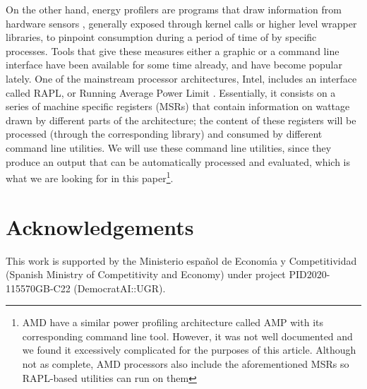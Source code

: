 \documentclass[a4paper,twoside]{article}
\begin{document}
On the other hand, energy profilers are programs that draw information from
hardware sensors \cite{sinha2001jouletrack}, generally exposed through kernel
calls or higher level wrapper libraries, to pinpoint consumption during a period
of time of by specific processes. Tools that give these measures either a
graphic  or a command line interface have been available for some time already,
and have become popular lately. One of the mainstream processor architectures,
Intel, includes an interface called RAPL, or Running Average Power
Limit \cite{rapl}. Essentially, it consists on a series of machine specific registers (MSRs)
that contain information on wattage drawn by different parts of the
architecture; the content of these registers will be processed (through the
corresponding library) and consumed by different command line utilities. We will
use these command line utilities, since they produce an output that can be
automatically processed and evaluated, which is what we are looking for in this
paper\footnote{AMD have a similar power profiling architecture called AMP with
  its corresponding command line tool. However, it was not well documented and
  we found it excessively complicated for the purposes of this article. Although
  not as complete, AMD processors also include the aforementioned MSRs so
  RAPL-based utilities can run on them}.

\section*{Acknowledgements}

This work is supported by the Ministerio espa\~{n}ol de Econom\'{\i}a y
Competitividad (Spanish Ministry of Competitivity and Economy) under project
PID2020-115570GB-C22 (DemocratAI::UGR).



{\small
}
\end{document}
